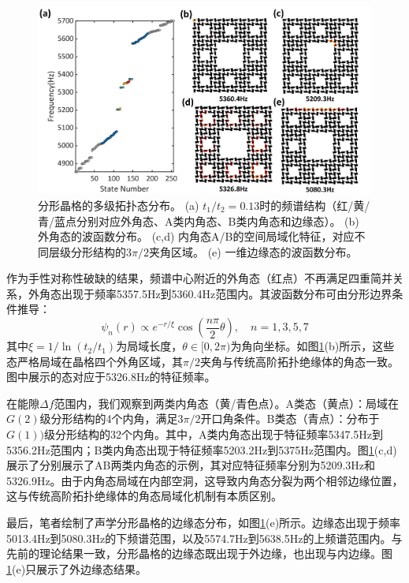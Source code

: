 \begin{figure}[htbp]
    \centering
    \includegraphics[width=0.9\linewidth]{figure/HOTIExp/ComsolWholeLat.png}
    \caption{分形晶格的多级拓扑态分布。 (a) $t_1/t_2=0.13$时的频谱结构（红/黄/青/蓝点分别对应外角态、A类内角态、B类内角态和边缘态）。 
    (b) 外角态的波函数分布。
    (c,d) 内角态A/B的空间局域化特征，对应不同层级分形结构的$3\pi/2$夹角区域。
     (e) 一维边缘态的波函数分布。}
    \label{fig:ComsolWholeLat}
\end{figure}

作为手性对称性破缺的结果，频谱中心附近的外角态（红点）不再满足四重简并关系，外角态出现于频率5357.5Hz到5360.4Hz范围内。其波函数分布可由分形边界条件推导：
\begin{equation}
    \psi_n(r) \propto e^{-r/\xi}\cos\left(\frac{n\pi}{2}\theta\right),\quad n=1,3,5,7
\end{equation}
其中$\xi=1/\ln(t_2/t_1)$为局域长度，$\theta\in[0,2\pi)$为角向坐标。如图\ref{fig:ComsolWholeLat}(b)所示，这些态严格局域在晶格四个外角区域，其$\pi/2$夹角与传统高阶拓扑绝缘体的角态一致。图中展示的态对应于5326.8Hz的特征频率。

在能隙$\Delta f$范围内，我们观察到两类内角态（黄/青色点）。A类态（黄点）：局域在$G(2)$级分形结构的4个内角，满足$3\pi/2$开口角条件。B类态（青点）：分布于$G(1))$级分形结构的32个内角。其中，A类内角态出现于特征频率5347.5Hz到5356.2Hz范围内；B类内角态出现于特征频率5203.2Hz到5375Hz范围内。图\ref{fig:ComsolWholeLat}(c,d)展示了分别展示了AB两类内角态的示例，其对应特征频率分别为5209.3Hz和5326.9Hz。由于内角态局域在内部空洞，这导致内角态分裂为两个相邻边缘位置，这与传统高阶拓扑绝缘体的角态局域化机制有本质区别。

最后，笔者绘制了声学分形晶格的边缘态分布，如图\ref{fig:ComsolWholeLat}(e)所示。边缘态出现于频率5013.4Hz到5080.3Hz的下频谱范围，以及5574.7Hz到5638.5Hz的上频谱范围内。与先前的理论结果一致，分形晶格的边缘态既出现于外边缘，也出现与内边缘。图\ref{fig:ComsolWholeLat}(e)只展示了外边缘态结果。


